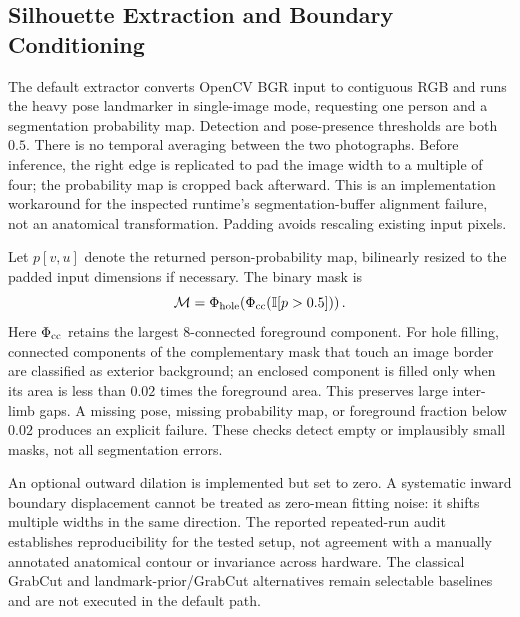 \subsection{Silhouette Extraction and Boundary Conditioning}
\label{subsec:segmentation}
The default extractor converts OpenCV BGR input to contiguous RGB and runs the heavy pose landmarker in single-image mode, requesting one person and a segmentation probability map. Detection and pose-presence thresholds are both $0.5$. There is no temporal averaging between the two photographs. Before inference, the right edge is replicated to pad the image width to a multiple of four; the probability map is cropped back afterward. This is an implementation workaround for the inspected runtime's segmentation-buffer alignment failure, not an anatomical transformation. Padding avoids rescaling existing input pixels.

Let $p[v,u]$ denote the returned person-probability map, bilinearly resized to the padded input dimensions if necessary. The binary mask is
\begin{equation}
\mathcal M=\Phi_{\rm hole}\!\left(\Phi_{\rm cc}\!\left(\mathbb I[p>0.5]\right)\right).
\label{eq:mask}
\end{equation}
Here $\Phi_{\rm cc}$ retains the largest 8-connected foreground component. For hole filling, connected components of the complementary mask that touch an image border are classified as exterior background; an enclosed component is filled only when its area is less than $0.02$ times the foreground area. This preserves large inter-limb gaps. A missing pose, missing probability map, or foreground fraction below $0.02$ produces an explicit failure. These checks detect empty or implausibly small masks, not all segmentation errors.

An optional outward dilation is implemented but set to zero. A systematic inward boundary displacement cannot be treated as zero-mean fitting noise: it shifts multiple widths in the same direction. The reported repeated-run audit establishes reproducibility for the tested setup, not agreement with a manually annotated anatomical contour or invariance across hardware. The classical GrabCut and landmark-prior/GrabCut alternatives remain selectable baselines and are not executed in the default path.


